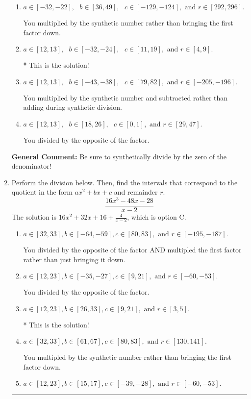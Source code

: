 \documentclass{extbook}[14pt]
\newcommand{\litem}[1]{\item #1

\rule{\textwidth}{0.4pt}}
\begin{document}
\begin{enumerate}
{\begin{enumerate}[label=\Alph*.]
 You divided by the opposite of the factor AND multiplied the first factor rather than just bringing it down.
\item \( a \in [-32, -22], \text{   } b \in [36, 49], \text{   } c \in [-129, -124], \text{   and   } r \in [292, 296]. \)

 You multiplied by the synthetic number rather than bringing the first factor down.
\item \( a \in [12, 13], \text{   } b \in [-32, -24], \text{   } c \in [11, 19], \text{   and   } r \in [4, 9]. \)

* This is the solution!
\item \( a \in [12, 13], \text{   } b \in [-43, -38], \text{   } c \in [79, 82], \text{   and   } r \in [-205, -196]. \)

 You multiplied by the synthetic number and subtracted rather than adding during synthetic division.
\item \( a \in [12, 13], \text{   } b \in [18, 26], \text{   } c \in [0, 1], \text{   and   } r \in [29, 47]. \)

 You divided by the opposite of the factor.
\end{enumerate}

\textbf{General Comment:} Be sure to synthetically divide by the zero of the denominator!
}
\litem{
Perform the division below. Then, find the intervals that correspond to the quotient in the form $ax^2+bx+c$ and remainder $r$.
\[ \frac{16x^{3} -48 x -28}{x -2} \]The solution is \( 16x^{2} +32 x + 16 + \frac{4}{x -2} \), which is option C.\begin{enumerate}[label=\Alph*.]
\item \( a \in [32, 33], b \in [-64, -59], c \in [80, 83], \text{ and } r \in [-195, -187]. \)

 You divided by the opposite of the factor AND multipled the first factor rather than just bringing it down.
\item \( a \in [12, 23], b \in [-35, -27], c \in [9, 21], \text{ and } r \in [-60, -53]. \)

 You divided by the opposite of the factor.
\item \( a \in [12, 23], b \in [26, 33], c \in [9, 21], \text{ and } r \in [3, 5]. \)

* This is the solution!
\item \( a \in [32, 33], b \in [61, 67], c \in [80, 83], \text{ and } r \in [130, 141]. \)

 You multipled by the synthetic number rather than bringing the first factor down.
\item \( a \in [12, 23], b \in [15, 17], c \in [-39, -28], \text{ and } r \in [-60, -53]. \)


\end{enumerate}}
\end{enumerate}
\end{document}
